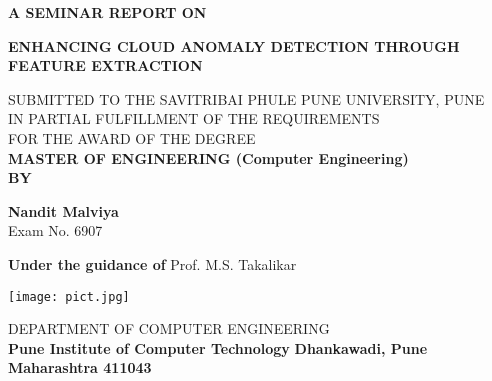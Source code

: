\documentclass[a4paper, 12pt]{article}
\begin{document}
 
\begin{titlepage}
    \begin{center}
        \vspace*{1cm}
        
        \large
        \textbf{A SEMINAR REPORT ON}
        
        \vspace{0.5cm}
        \large
        \textbf{ ENHANCING CLOUD ANOMALY DETECTION THROUGH FEATURE EXTRACTION }
        \linebreak
        \linebreak
		
		\small
		SUBMITTED TO THE SAVITRIBAI PHULE PUNE UNIVERSITY, PUNE \\
		IN PARTIAL FULFILLMENT OF THE REQUIREMENTS \\
		FOR THE AWARD OF THE DEGREE\\ 
        \large
		\textbf{MASTER OF ENGINEERING (Computer Engineering)}\\
		\vspace{0.5cm}
		\textbf{BY}
		\vspace{1cm}
		
        \textbf{ Nandit Malviya }
        \\ Exam No. 6907
        \linebreak
        \linebreak
		        
        \textbf{\large{Under the guidance of}}
		\linebreak
	    Prof. M.S. Takalikar
		\linebreak
        \vfill
        
        
        
        \vspace{0.8cm}
        

        \texttt{[image: pict.jpg]}   
        
        \Large
        DEPARTMENT OF COMPUTER ENGINEERING\\
        \textbf{Pune Institute of Computer Technology}	
		\textbf{Dhankawadi, Pune}
		\linebreak
		\textbf{Maharashtra 411043}
        
    \end{center}
\end{titlepage}
\pagebreak
\end{document}
